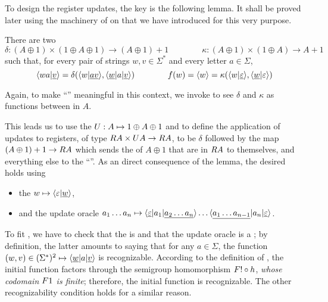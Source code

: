 To design the register updates, the key is the following lemma. It shall be proved later using the machinery of  on  that we have introduced for this very purpose.
\begin{lemma}\label{lem:compute-next-configuration}
  There are two 
  \[
    \delta\colon (A \oplus 1) \times (1 \oplus A \oplus 1) \to (A \oplus 1) + 1
    \qquad\qquad
    \kappa\colon (A \oplus 1) \times (1 \oplus A) \to A + 1
  \]
  such that, for every pair of strings $w,v \in \Sigma^*$ and every letter $a
  \in \Sigma$,
  \[ \langle wa|\underline v \rangle = \delta(\langle w|\underline
      {av} \rangle,\langle \underline w | a|\underline v \rangle) \qquad\qquad f(w) = \langle w \rangle =
    \kappa(\langle w|\underline\varepsilon \rangle,\langle \underline w | \varepsilon \rangle) \]
\end{lemma}
Again, to make \enquote{} meaningful in this context, we invoke
 to see $\delta$ and $\kappa$ as
functions between  in $A$.

This leads us to use the  $\functoru : A \mapsto 1 \oplus A \oplus
1$ and to define the application of updates to registers, of type $\functorr A
\times \functoru A \to \functorr A$, to be $\delta$ followed by the map $(A
\oplus 1) + 1 \to \functorr A$ which sends the  of $A \oplus 1$ that
are in $\functorr A$ to themselves, and everything else to the \enquote{}. As an direct consequence of the lemma, the desired  holds using
\begin{itemize}
  \item the  $w \mapsto \langle \varepsilon|\underline{w} \rangle$,
  \item and the update oracle $a_1 \dots a_n \mapsto \langle \underline\varepsilon|a_1|\underline{a_2 \dots a_n} \rangle \dots
  \langle \underline{a_1 \dots a_{n-1}}|a_n|\underline\varepsilon \rangle$.
\end{itemize}
To fit , we have to check that the  is  and that the update oracle is a ; by definition, the latter amounts to saying that for any $a\in\Sigma$, the function $(w,v) \in (\Sigma^*)^2 \mapsto \langle \underline{w}|a|\underline{v} \rangle$ is recognizable. According to the definition of , the initial function factors through the semigroup homomorphism $\functor! \circ h$, \emph{whose codomain $\functor1$ is finite}; therefore, the initial function is recognizable. The other recognizability condition holds for a similar reason.

